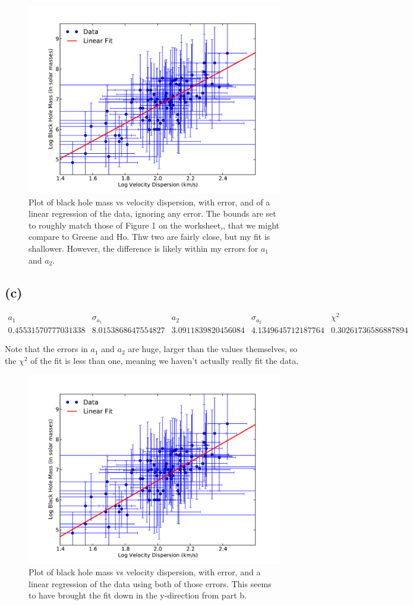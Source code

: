 \documentclass[11pt,letterpaper]{article}
\begin{document}
\begin{figure}[!htb]\centering
  \includegraphics[width=1\textwidth]{PartB}
  \caption{Plot of black hole mass vs velocity dispersion, with error, and of a linear regression of the data, ignoring any error. The bounds are set to roughly match those of Figure 1 on the worksheet,, that we might compare to Greene and Ho. Thw two are fairly close, but my fit is shallower. However, the difference is likely within my errors for $a_1$ and $a_2$.}
  \end{figure}

\subsection*{(c)}

\[
\begin{array}{ccccc}
a_1 & \sigma_{a_1} & a_2 & \sigma_{a_2} & \chi^2 \\
0.45531570777031338 & 8.0153868647554827 & 3.0911839820456084 & 4.1349645712187764 & 0.30261736586887894
\end{array}
\]

Note that the errors in $a_1$ and $a_2$ are huge, larger than the values themselves, so the $\chi^2$ of the fit is less than one, meaning we haven't actually really fit the data. 

\begin{figure}[!htb]\centering
  \includegraphics[width=1\textwidth]{PartC}
  \caption{Plot of black hole mass vs velocity dispersion, with error, and a linear regression of the data using both of those errors. This seems to have brought the fit down in the y-direction from part b.}
  \end{figure}
\end{document}
